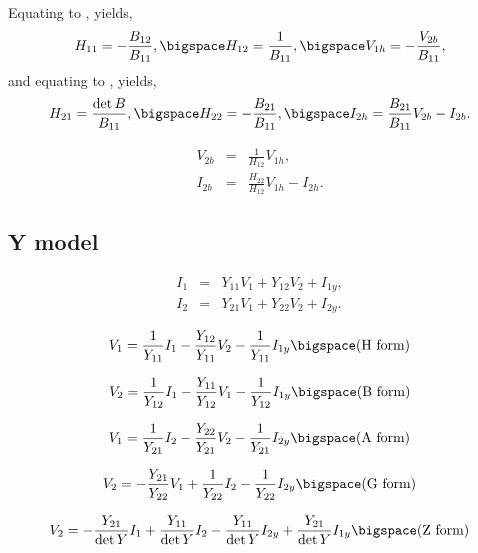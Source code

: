 \documentclass[a4paper, 12pt]{article}
\begin{document}
Equating  to , yields,
%
\begin{equation}
  H_{11} = -\frac{B_{12}}{B_{11}}, \bigspace H_{12} = \frac{1}{B_{11}}, \bigspace V_{1h} = -\frac{V_{2b}}{B_{11}},
\end{equation}
%
and equating to , yields,
%
\begin{equation}
  H_{21} = \frac{\det{B}}{B_{11}}, \bigspace H_{22} = -\frac{B_{21}}{B_{11}}, \bigspace I_{2h} = \frac{B_{21}}{B_{11}} V_{2b} - I_{2b}.
\end{equation}


\begin{eqnarray}
  V_{2b} & = & \frac{1}{H_{12}} V_{1h}, \\
  I_{2b} & = & \frac{H_{22}}{H_{12}} V_{1h} - I_{2h}.
\end{eqnarray}




\subsection{Y model}

\begin{eqnarray}
\label{eqn:YI1}
  I_1 & = & Y_{11} V_1 + Y_{12} V_2 + I_{1y}, \\
  I_2 & = & Y_{21} V_1 + Y_{22} V_2 + I_{2y}.
\label{eqn:YI2}
\end{eqnarray}



\begin{equation}
  V_1 = \frac{1}{Y_{11}} I_1 - \frac{Y_{12}}{Y_{11}} V_2 - \frac{1}{Y_{11}} I_{1y} \bigspace \mbox{(H form)}
\end{equation}

\begin{equation}
  V_2 = \frac{1}{Y_{12}} I_1 - \frac{Y_{11}}{Y_{12}} V_1 - \frac{1}{Y_{12}} I_{1y} \bigspace \mbox{(B form)}
\end{equation}

\begin{equation}
  V_1 = \frac{1}{Y_{21}} I_2 - \frac{Y_{22}}{Y_{21}} V_2 - \frac{1}{Y_{21}} I_{2y} \bigspace \mbox{(A form)}
\end{equation}


\begin{equation}
  V_2 = -\frac{Y_{21}}{Y_{22}} V_1 + \frac{1}{Y_{22}} I_2 - \frac{1}{Y_{22}} I_{2y} \bigspace \mbox{(G form)}
\end{equation}


\begin{equation}
  V_2 = -\frac{Y_{21}}{\det{Y}} I_1 + \frac{Y_{11}}{\det{Y}} I_2 - \frac{Y_{11}}{\det{Y}} I_{2y} + \frac{Y_{21}}{\det{Y}} I_{1y} \bigspace \mbox{(Z form)}
\end{equation}
\end{document}
